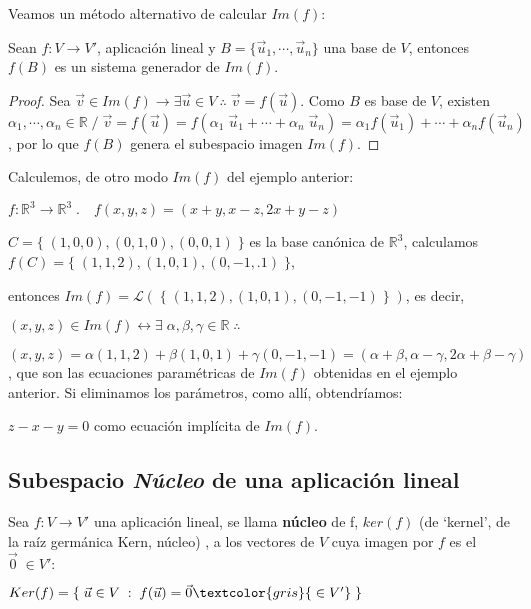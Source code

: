 Veamos un método alternativo de calcular $Im(f)$:

\begin{prop}
Sean $f:V\to V'$, aplicación lineal y $B=\{ \vec u_1, \cdots , \vec u_n \}$ una base de $V$, entonces $f(B)$ es un sistema generador de $Im(f)$.
\end{prop}

\begin{proof}
\textcolor{gris}{ Sea $\vec v\in Im(f) \to \exists \vec u \in V\ \therefore \; \vec v=f(\vec u)$. Como $B$ es base de $V$, existen $\alpha_1, \cdots , \alpha_n \in \mathbb R \; / \; \vec v = f(\vec u)= f(\alpha_1\; \vec u_1 + \cdots + \alpha_n\; \vec u_n)=\alpha_1 f(\vec u_1)	+ \cdots + \alpha_n f(\vec u_n)$, por lo que $f(B)$ genera el subespacio imagen $Im(f)$.}
\end{proof}

\begin{ejem} Calculemos, de otro modo $Im(f)$ del ejemplo anterior:

\noindent $f:\mathbb R^3 \to \mathbb R^3\;.\quad f(x,y,z)=(x+y,x-z,2x+y-z)$

\noindent$C=\{\; (1,0,0),(0,1,0),(0,0,1) \;\}$ es la base canónica de $\mathbb R^3$, calculamos $f(C)=\{\; (1,1,2),(1,0,1),(0,-1,.1) \;\}$, 

\noindent entonces $Im(f)=\mathcal L(\; \{\; (1,1,2),(1,0,1),(0,-1,-1) \;\} \; )$, es decir,

\noindent $(x,y,z)\in Im(f) \leftrightarrow \exists \; \alpha, \beta, \gamma \in \mathbb R\; \therefore \;$ 

\noindent $ (x,y,z)= \alpha (1,1,2)+ \beta (1,0,1) + \gamma (0,-1,-1)= (\alpha+\beta , \alpha-\gamma, 2\alpha+\beta-\gamma)$, que son las ecuaciones paramétricas de $Im(f)$ obtenidas en el ejemplo anterior. Si eliminamos los parámetros, como allí, obtendríamos:

\noindent  $z-x-y=0$ como ecuación implícita de $Im(f)$.
	
\end{ejem}



\subsection{Subespacio \emph{Núcleo} de una aplicación lineal}

\begin{defi}
Sea $f:V \to V'$ una aplicación lineal, se llama \textbf{núcleo}	 de f, $ker(f)$ \textcolor{gris}{ (de `kernel', de la raíz germánica Kern, núcleo) }, a los vectores de $V$ cuya imagen por $f$ es el $\vec 0 \;\in V':$

$Ker(f)=\{\; \vec u \in V \; : \; f(\vec u)=\vec 0 \textcolor{gris}{\; \in V'} \;\}$

\end{defi}

